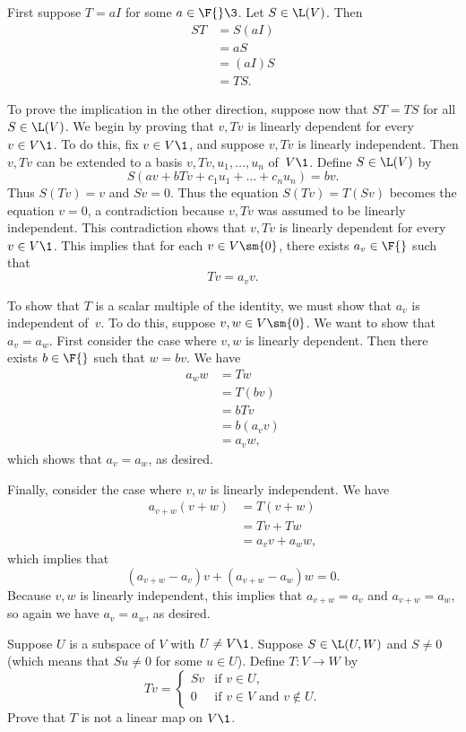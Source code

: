 \begin{Solution}
First suppose $T = aI$ for some $a \in \F{}\3$.  Let $S \in \L(V)$.  Then
\begin{align*}
ST &= S(aI) \\
&= aS \\
&= (aI)S \\
&= TS.
\end{align*}

To prove the implication in the other direction, suppose now that $ST = TS$ for all
$S \in \L(V)$.  We begin by proving that $v,Tv$ is linearly dependent for every
$v \in V\1$.  To do this, fix $v \in V\1$, and suppose $v, Tv$ is linearly
independent.  Then $v, Tv$ can be extended to a basis $v, Tv, u_1, \dots, u_n$
of~$V\1$.  Define $S \in \L(V)$ by
\[
S(av + bTv + c_1 u_1 + \dots + c_n u_n) = bv.
\]
Thus $S(Tv) = v$ and $Sv = 0$.  Thus the equation $S(Tv) = T(Sv)$ becomes the
equation $v = 0$, a contradiction because $v, Tv$ was assumed to be linearly
independent.  This contradiction shows that $v,Tv$ is linearly dependent for
every $v \in V\1$.  This implies that for each $v \in V \sm \{0\}$, there
exists $a_v \in \F{}$ such that
\[
Tv = a_v v.
\]

To show that $T$ is a scalar multiple of the identity, we must show that $a_v$ is
independent of~$v$.  To do this, suppose $v, w \in V \sm \{0\}$.  We
want to show that $a_v = a_w$.  First consider the case where $v, w$ is
linearly dependent.  Then there exists $b \in \F{}$ such that $w = bv$.  We have
\begin{align*}
a_w w &= Tw\\
&= T(bv) \\
&= bTv \\
&= b(a_v v) \\
&= a_v w,
\end{align*}
which shows that $a_v = a_w$, as desired.

Finally, consider the case where $v, w$ is linearly independent.  We have
\begin{align*}
a_{v+w} (v + w) &= T(v + w) \\
&= Tv + Tw \\
&= a_v v + a_w w,
\end{align*}
which implies that
\[
(a_{v+w} - a_v) v + (a_{v+w} - a_w) w = 0.
\]
Because $v, w$ is linearly independent, this implies that $a_{v+w} = a_v$ and
$a_{v+w} = a_w$, so again we have $a_v = a_w$, as desired.
\end{Solution}

\exercise
Suppose $U$ is a subspace of $V$ with $U \ne V\1$. Suppose $S \in \L(U, W)$ and $S \ne 0$ (which means that $Su \ne 0$ for some $u \in U$). Define $T \colon V \to W$ by
\[
Tv =
\begin{cases}
Sv & \text{if } v \in U,\\
0 & \text{if } v \in V \text{\ and \ }v \notin U.
\end{cases}
\]
Prove that $T$ is not a linear map on $V\1$.

